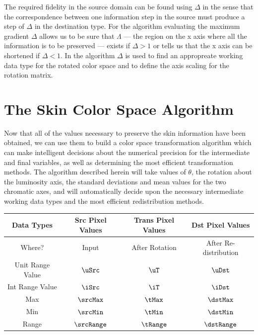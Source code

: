 The required fidelity in the source domain can be found using $ \Delta$ in the sense that the correspondence between one information step in the source must produce a step of $\Delta$ in the destination type. For the algorithm evaluating the maximum gradient $\Delta$ allows us to be sure that  $\Lambda$ --- the region on the x axis where all the information is to be preserved --- exists if $\Delta >1$ or tells us that the x axis can be shortened if  $\Delta < 1$. In the algorithm $\Delta$ is used to find an appropreate working data type for the rotated color space and to define the axis scaling for the rotation matrix.

\section{The Skin Color Space Algorithm}

Now that all of the values necessary to preserve the skin information have been obtained, we can use them to build a color space transformation algorithm which can make intelligent decisions about the numerical precision for the intermediate and final variables, as well as determining the most efficient transformation methods. The algorithm described herein will take values of $\theta$, the rotation about the luminosity axis, the standard deviations and mean values for the two chromatic axes, and will automatically decide upon the necessary intermediate working data types and the most efficient redistribution methods.



\begin{tabular}{|c|c|c|c|}
  \hline
     Data Types & Src Pixel Values & Trans Pixel Values & Dst Pixel Values \\ \hline
  Where? & Input & After Rotation & After Re-distribution \\ \hline
  Unit Range Value & $ \uSrc $ & $\uT$ & $\uDst$ \\ \cline{1-1}
  Int Range Value & $\iSrc$ & $\iT$ & $\iDst$ \\ \cline{1-1}
  Max & $\srcMax$ & $\tMax$ & $\dstMax$ \\ \cline{1-1}
  Min & $\srcMin$ & $\tMin$ & $\dstMin$ \\ \cline{1-1}
  Range & $\srcRange$ & $\tRange$ & $\dstRange$ \\
  \hline
\end{tabular}

